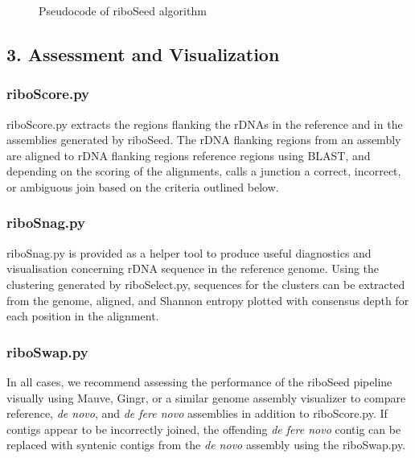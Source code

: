 \documentclass[10pt]{article}
\begin{document}
\begin{linenumbers}
\begin{figure}[h]
\begin{minipage}{.6\linewidth}
\begin{algorithm}[H]
    \end{algorithm}
  \end{minipage}
  \caption{Pseudocode of riboSeed algorithm}
  \label{fig:algo}
\end{figure}


\subsection*{3. Assessment and Visualization}
\subsubsection*{riboScore.py}
riboScore.py extracts the regions flanking the rDNAs in the reference and in the assemblies generated by riboSeed. The rDNA flanking regions from an assembly are aligned to rDNA flanking regions reference regions using BLAST, and depending on the scoring of the alignments, calls a junction a correct, incorrect, or ambiguous join based on the criteria outlined below.
\subsubsection*{riboSnag.py}
riboSnag.py is provided as a helper tool to produce useful diagnostics and visualisation concerning rDNA sequence in the reference genome. Using the clustering generated by riboSelect.py, sequences for the clusters can be extracted from the genome, aligned, and Shannon entropy \cite{Schmitt1997} plotted with consensus depth for each position in the alignment.
\subsubsection*{riboSwap.py}
In all cases, we recommend assessing the performance of the riboSeed pipeline visually using Mauve\cite{Darling2004,Darling2011}, Gingr\cite{Treangen2014}, or a similar genome assembly visualizer to compare reference, \textit{de novo}, and \textit{de fere novo} assemblies in addition to riboScore.py. If contigs appear to be incorrectly joined, the offending \textit{de fere novo} contig can be replaced with syntenic contigs from the \textit{de novo} assembly using the riboSwap.py.



\end{linenumbers}
\end{document}
